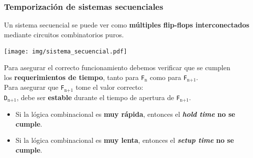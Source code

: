 \documentclass[aspectratio=169]{beamer}
\begin{document}
\begin{frame}[fragile,t]
    \frametitle{Temporización de sistemas secuenciales}
    Un sistema secuencial se puede ver como \textbf{múltiples flip-flops interconectados}\\
    mediante circuitos combinatorios puros.
    \begin{center}
     \texttt{[image: img/sistema\_secuencial.pdf]}
    \end{center}
    \pause
    Para asegurar el correcto funcionamiento debemos verificar que se cumplen\\
    los \textbf{requerimientos de tiempo}, tanto para \texttt{F$_\text{n}$} como para \texttt{F$_{\text{n+1}}$}.\\
    \bigskip
    \pause
    \textcolor{verdeuca}{Para asegurar que \texttt{F$_{\text{n+1}}$} tome el valor correcto}:\\
    \texttt{D$_{\text{n+1}}$}, debe ser \textbf{estable} durante el tiempo de apertura de \texttt{F$_{\text{n+1}}$}.\\
    \begin{itemize}
    \item Si la lógica combinacional es \textcolor{naranjauca}{\textbf{muy rápida}}, entonces el \textcolor{naranjauca}{\textbf{\emph{hold time} no se cumple}}.
    \item Si la lógica combinacional es \textcolor{naranjauca}{\textbf{muy lenta}}, entonces  el \textcolor{naranjauca}{\textbf{\emph{setup time} no se cumple}}.
    \end{itemize}
\end{frame}
\end{document}
